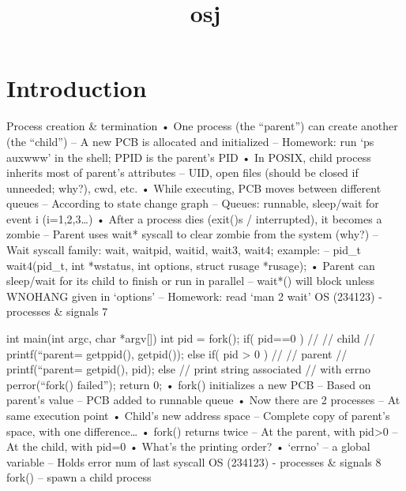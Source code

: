 \documentclass[12pt]{report}
\title{osj}
\author{}
\begin{document}
\maketitle
\tableofcontents
\newpage

\section{Introduction}
Process creation & termination
• One process (the “parent”) can create another (the “child”)
– A new PCB is allocated and initialized
– Homework: run ‘ps auxwww’ in the shell; PPID is the parent’s PID
• In POSIX, child process inherits most of parent’s attributes
– UID, open files (should be closed if unneeded; why?), cwd, etc.
• While executing, PCB moves between different queues
– According to state change graph 
– Queues: runnable, sleep/wait for event i (i=1,2,3…)
• After a process dies (exit()s / interrupted), it becomes a zombie
– Parent uses wait* syscall to clear zombie from the system (why?)
– Wait syscall family: wait, waitpid, waitid, wait3, wait4; example:
– pid\_t wait4(pid\_t, int *wstatus, int options, struct rusage *rusage); 
• Parent can sleep/wait for its child to finish or run in parallel
– wait*() will block unless WNOHANG given in ‘options’
– Homework: read ‘man 2 wait’
OS (234123) - processes & signals
7

int main(int argc, char *argv[])
{
  int pid = fork();
  if( pid==0 ) { 
   //
   // child
      //
      printf(“parent=%
             getppid(), getpid());
  }
  else if( pid > 0 ) {
      //
      // parent
      //
      printf(“parent=%
             getpid(), pid);
  }
  else { // print string associated
         // with errno   
      perror(“fork() failed”); 
  }
  return 0;
}
• fork() initializes a new PCB
– Based on parent’s value
– PCB added to runnable queue
• Now there are 2 processes
– At same execution point
• Child’s new address space 
– Complete copy of parent’s 
space, with one difference…
• fork() returns twice
– At the parent, with pid>0
– At the child, with pid=0
• What’s the printing order?
• ‘errno’ – a global variable
– Holds error num of last syscall
OS (234123) - processes & signals
8
fork() – spawn a child process
\end{document}
